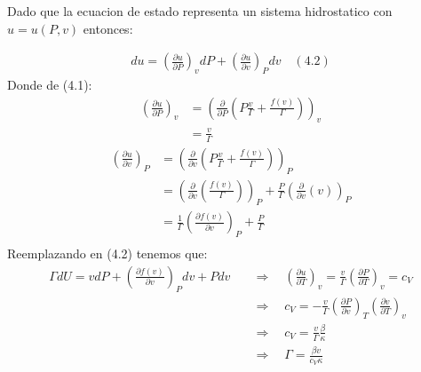 \documentclass[a4paper]{article}
\begin{document}
    \begin{answer}[Punto 4]
        Dado que la ecuacion de estado representa un sistema hidrostatico con $u = u(P,v)$ entonces:

        \begin{align*}
            du = \left( \frac{\partial u}{\partial P} \right)_v dP + \left( \frac{\partial u}{\partial v} \right)_P dv \quad (4.2)
        \end{align*}
        Donde de (4.1):
        \begin{align*}
            \left(\frac {\partial u}{\partial P}\right)_v &= \left(
                \frac{\partial}{\partial P} \left(  P\frac v\Gamma + \frac{f(v)}\Gamma \right)
            \right)_v \\ 
            &= \frac{v}{\Gamma} 
        \end{align*}
        \begin{align*}
            \left(\frac {\partial u}{\partial v}\right)_P &= \left(
                \frac{\partial}{\partial v} \left(  P\frac v\Gamma + \frac{f(v)}\Gamma \right)
            \right)_P\\
            &= \left( \frac{\partial}{\partial v} \left( \frac{f(v)}\Gamma \right) \right)_P + \frac P \Gamma\left( \frac{\partial}{\partial v} \left(  v \right) \right)_P\\
            &= \frac 1\Gamma \left( \frac{\partial f(v)}{\partial v} \right)_P + \frac P \Gamma\\
        \end{align*}
        Reemplazando en (4.2) tenemos que:
        \begin{align*}
            \Gamma dU = v dP + \left( \frac{\partial f(v)}{\partial v} \right)_P dv + P dv \quad  &\Rightarrow \quad \left(\frac {\partial u}{\partial T}\right)_v = \frac v\Gamma \left( \frac{\partial P}{\partial T} \right)_v = c_V\\
            &\Rightarrow \quad c_V =- \frac v\Gamma \left( \frac{\partial P}{\partial v } \right)_T \left( \frac{\partial v}{\partial T} \right)_v\\
            &\Rightarrow \quad c_V = \frac v\Gamma \frac \beta \kappa \\
            &\Rightarrow \quad \Gamma = \frac{\beta v}{c_V \kappa}
        \end{align*}
       
    \end{answer}
    
\end{document}

